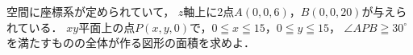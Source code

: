 \documentclass[../../main.tex]{subfiles}
\begin{document}
空間に座標系が定められていて，
$z$軸上に2点$A(0,0,6)$，$B(0,0,20)$が与えられている．
$xy$平面上の点$P(x,y,0)$で，$0 \leqq x \leqq 15$，$0 \leqq y \leqq 15$，
$\angle APB \geqq 30^\circ$を満たすものの全体が作る図形の面積を求めよ．
\end{document}
